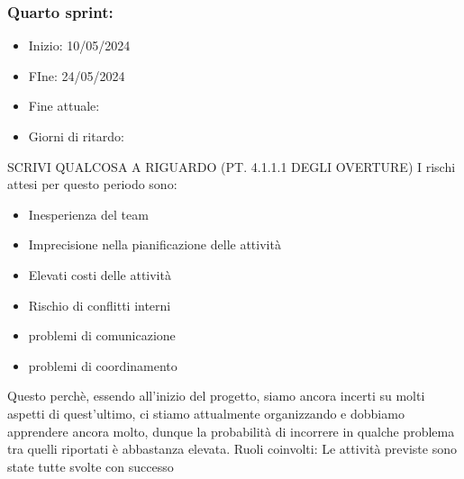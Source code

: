 \documentclass[italian,12pt]{article} %
\begin{document}
    \subsubsection{Quarto sprint:}
    \begin{itemize}
        \item Inizio: 10/05/2024
        \item FIne: 24/05/2024
        \item Fine attuale:
        \item Giorni di ritardo:
    \end{itemize}
    SCRIVI QUALCOSA A RIGUARDO (PT. 4.1.1.1 DEGLI OVERTURE)
    I rischi attesi per questo periodo sono:
    \begin{itemize}
        \item Inesperienza del team
        \item Imprecisione nella pianificazione delle attività
        \item Elevati costi delle attività
        \item Rischio di conflitti interni 
        \item problemi di comunicazione
        \item problemi di coordinamento
    \end{itemize}
    Questo perchè, essendo all’inizio del progetto, siamo ancora incerti su molti aspetti di quest’ultimo, ci stiamo attualmente organizzando e dobbiamo apprendere ancora molto, dunque la probabilità di incorrere in qualche problema tra quelli riportati è abbastanza elevata.
    Ruoli coinvolti: 
    Le attività previste sono state tutte svolte con successo
\end{document}
